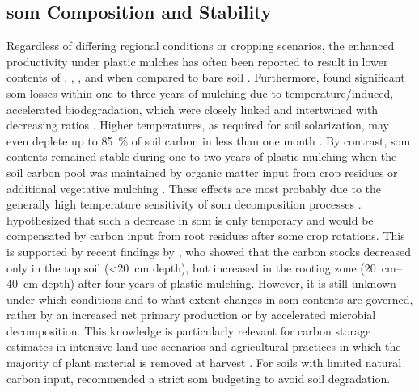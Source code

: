 \subsection{\Acs{som} Composition and Stability}

Regardless of differing regional conditions or cropping scenarios, the enhanced productivity under plastic mulches has often been reported to result in lower contents of , , , and  when compared to bare soil \citep{Domagala-SwiatkiewiczEffect2013,LiInfluence2007,SchonbeckEffects1998a}. Furthermore, \citet{MorenoEffect2008,LiDynamics2004,LiInfluence2007,ZhangEffects2015} found significant \ac{som} losses within one to three years of mulching due to temperature\-/induced, accelerated biodegradation, which were closely linked and intertwined with decreasing  ratios \citep{JiaDynamics2006,ZhouRidgefurrow2012}. Higher temperatures, as required for soil solarization, may even deplete up to \SI{85}{\percent} of soil carbon in less than one month \citep{SimmonsManaging2013}. By contrast, \ac{som} contents remained stable during one to two years of plastic mulching when the soil carbon pool was maintained by organic matter input from crop residues or additional vegetative mulching \citep{SchonbeckEffects1998a,TindallMulch1991}. These effects are most probably due to the generally high temperature sensitivity of \ac{som} decomposition processes \citep{LarionovaEffect2014, vonLutzowTemperature2009}. \citet{GanRidgeFurrow2013} hypothesized that such a decrease in \ac{som} is only temporary and would be compensated by carbon input from root residues after some crop rotations. This is supported by recent findings by \citet{LuoSensitivity2015}, who showed that the carbon stocks decreased only in the top soil (\SI{<20}{\centi\meter} depth), but increased in the rooting zone (\SIrange{20}{40}{\centi\meter} depth) after four years of plastic mulching. However, it is still unknown under which conditions and to what extent changes in \ac{som} contents are governed, rather by an increased net primary production or by accelerated microbial decomposition. This knowledge is particularly relevant for carbon storage estimates in intensive land use scenarios and agricultural practices in which the majority of plant material is removed at harvest \citep{ChapmanSoil2012,PardoCultivationInduced2012,TianEffects2012}. For soils with limited natural carbon input, \citet{ZhangEffects2015} recommended a strict \ac{som} budgeting to avoid soil degradation.

